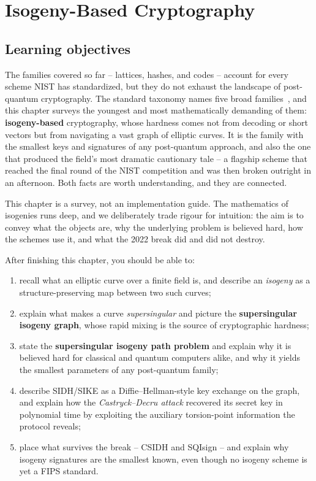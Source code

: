 \chapter{Isogeny-Based Cryptography}
\label{ch:isogeny}

\section{Learning objectives}

The families covered so far -- lattices, hashes, and codes -- account for every scheme NIST has standardized, but they do not exhaust the landscape of post-quantum cryptography. The standard taxonomy names five broad families~\cite{bernstein2009}, and this chapter surveys the youngest and most mathematically demanding of them: \textbf{isogeny-based} cryptography, whose hardness comes not from decoding or short vectors but from navigating a vast graph of elliptic curves. It is the family with the smallest keys and signatures of any post-quantum approach, and also the one that produced the field's most dramatic cautionary tale -- a flagship scheme that reached the final round of the NIST competition and was then broken outright in an afternoon. Both facts are worth understanding, and they are connected.

This chapter is a survey, not an implementation guide. The mathematics of isogenies runs deep, and we deliberately trade rigour for intuition: the aim is to convey what the objects are, why the underlying problem is believed hard, how the schemes use it, and what the 2022 break did and did not destroy.

After finishing this chapter, you should be able to:

\begin{enumerate}
  \item recall what an elliptic curve over a finite field is, and describe an \emph{isogeny} as a structure-preserving map between two such curves;
  \item explain what makes a curve \emph{supersingular} and picture the \textbf{supersingular isogeny graph}, whose rapid mixing is the source of cryptographic hardness;
  \item state the \textbf{supersingular isogeny path problem} and explain why it is believed hard for classical and quantum computers alike, and why it yields the smallest parameters of any post-quantum family;
  \item describe SIDH/SIKE as a Diffie--Hellman-style key exchange on the graph, and explain how the \emph{Castryck--Decru attack} recovered its secret key in polynomial time by exploiting the auxiliary torsion-point information the protocol reveals;
  \item place what survives the break -- CSIDH and SQIsign -- and explain why isogeny signatures are the smallest known, even though no isogeny scheme is yet a FIPS standard.
\end{enumerate}

